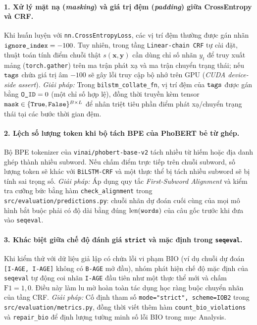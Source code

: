 \documentclass[11pt,a4paper,twocolumn]{article}
\begin{document}
\paragraph{1. Xử lý mặt nạ (\textit{masking}) và giá trị đệm (\textit{padding}) giữa CrossEntropy và CRF.}
Khi huấn luyện với \texttt{nn.CrossEntropyLoss}, các vị trí đệm thường được gán nhãn $\text{\texttt{ignore\_index}} = -100$. Tuy nhiên, trong tầng \texttt{Linear-chain CRF} tự cài đặt, thuật toán tính điểm chuỗi thật $s(\mathbf{x}, \mathbf{y})$ cần dùng chỉ số nhãn $y_t$ để truy xuất mảng (\texttt{torch.gather}) trên ma trận phát xạ và ma trận chuyển trạng thái; nếu $\text{\texttt{tags}}$ chứa giá trị âm $-100$ sẽ gây lỗi truy cập bộ nhớ trên GPU (\textit{CUDA device-side assert}).
\textit{Giải pháp:} Trong \texttt{bilstm\_collate\_fn}, vị trí đệm của $\text{\texttt{tags}}$ được gán bằng $\text{\texttt{O\_ID}} = 0$ (một chỉ số hợp lệ), đồng thời truyền kèm tensor $\text{\texttt{mask}} \in \{\text{\texttt{True}}, \text{\texttt{False}}\}^{B \times L}$ để nhân triệt tiêu phần điểm phát xạ/chuyển trạng thái tại các bước thời gian đệm.

\paragraph{2. Lệch số lượng token khi bộ tách BPE của PhoBERT bẻ từ ghép.}
Bộ BPE tokenizer của \texttt{vinai/phobert-base-v2} \citep{nguyen-nguyen-2020-phobert} tách nhiều từ hiếm hoặc địa danh ghép thành nhiều subword. Nếu chấm điểm trực tiếp trên chuỗi subword, số lượng token sẽ khác với \texttt{BiLSTM-CRF} và một thực thể bị tách nhiều subword sẽ bị tính sai trọng số.
\textit{Giải pháp:} Áp dụng quy tắc \textit{First-Subword Alignment} và kiểm tra cưỡng bức bằng hàm \texttt{check\_alignment} trong \texttt{src/evaluation/predictions.py}: chuỗi nhãn dự đoán cuối cùng của mọi mô hình bắt buộc phải có độ dài bằng đúng $\text{len}(\text{\texttt{words}})$ của câu gốc trước khi đưa vào \texttt{seqeval}.

\paragraph{3. Khác biệt giữa chế độ đánh giá \texttt{strict} và mặc định trong \texttt{seqeval}.}
Khi kiểm thử với dữ liệu giả lập có chứa lỗi vi phạm BIO (ví dụ chuỗi dự đoán \texttt{[I-AGE, I-AGE]} không có \texttt{B-AGE} mở đầu), nhóm phát hiện chế độ mặc định của \texttt{seqeval} tự động coi nhãn \texttt{I-AGE} đầu tiên như một thực thể mới và chấm $\text{F1} = 1{,}0$. Điều này làm lu mờ hoàn toàn tác dụng học ràng buộc chuyển nhãn của tầng CRF.
\textit{Giải pháp:} Cố định tham số \texttt{mode="strict", scheme=IOB2} trong \texttt{src/evaluation/metrics.py}, đồng thời viết thêm hàm \texttt{count\_bio\_violations} và \texttt{repair\_bio} để định lượng tường minh số lỗi BIO trong mục Analysis.
\end{document}
